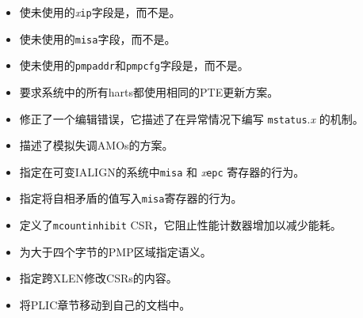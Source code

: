 \begin{itemize}
\item 使未使用的{\em x}{\tt ip}字段是\wpri，而不是\wiri。
\item 使未使用的{\tt misa}字段\warl，而不是\wiri。
\item 使未使用的{\tt pmpaddr}和{\tt pmpcfg}字段是\warl，而不是\wiri。
\item 要求系统中的所有harts都使用相同的PTE更新方案。
\item 修正了一个编辑错误，它描述了在异常情况下编写 {\tt mstatus}.{\em x} 的机制。
\item 描述了模拟失调AMOs的方案。
\item 指定在可变IALIGN的系统中{\tt misa} 和 {\em x}{\tt epc} 寄存器的行为。
\item 指定将自相矛盾的值写入{\tt misa}寄存器的行为。
\item 定义了{\tt mcountinhibit} CSR，它阻止性能计数器增加以减少能耗。
\item 为大于四个字节的PMP区域指定语义。
\item 指定跨XLEN修改CSRs的内容。
\item 将PLIC章节移动到自己的文档中。
\end{itemize}

